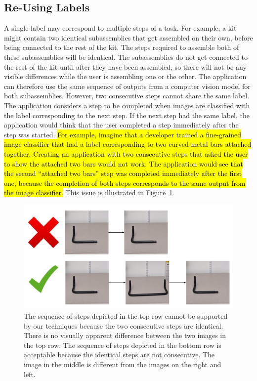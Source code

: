 \subsection{Re-Using Labels}

A single label may correspond to multiple steps of a task.
For example, a kit might contain two identical subassemblies that get assembled
on their own, before being connected to the rest of the kit.
The steps required to assemble both of these subassemblies will be identical.
The subassemblies do not get connected to the rest of the kit until after they
have been assembled, so there will not be any visible differences while the user
is assembling one or the other.
The application can therefore use the same sequence of outputs from a computer
vision model for both subassemblies.
However, two consecutive steps cannot share the same label.
The application considers a step to be completed when images are classified with
the label corresponding to the next step.
If the next step had the same label, the application would think that the user
completed a step immediately after the step was started.
\hl{
For example, imagine that a developer trained a fine-grained image classifier
that had a label corresponding to two curved metal bars attached together.
Creating an application with two consecutive steps that asked the user to show
the attached two bars would not work.
The application would see that the second ``attached two bars'' step was
completed immediately after the first one, because the completion of both steps
corresponds to the same output from the image classifier.
}
This issue is illustrated in Figure~\ref{fig:consec_step}.

\begin{figure}
  \includegraphics[width=\columnwidth]{figures/consec_step.pdf}
  \caption{
    The sequence of steps depicted in the top row cannot be supported by our
    techniques because the two consecutive steps are identical.
    There is no visually apparent difference between the two images in the top
    row.
    The sequence of steps depicted in the bottom row is acceptable because the
    identical steps are not consecutive.
    The image in the middle is different from the images on the right and left.
  }\label{fig:consec_step}
\end{figure}

